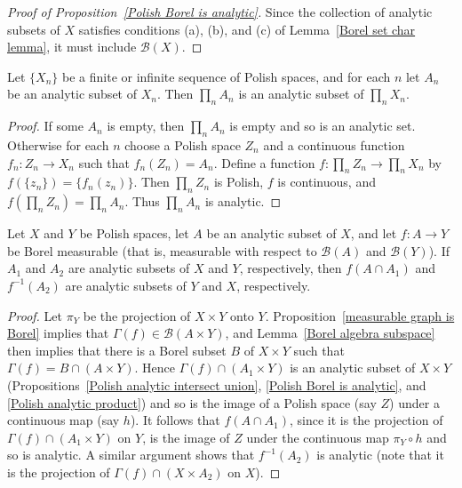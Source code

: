 \begin{proof}[Proof of Proposition~\ref{Polish Borel is analytic}]
Since the collection of analytic subsets of $X$ satisfies conditions (a), (b), and (c) of Lemma~\ref{Borel set char lemma}, it must include $\mathcal{B}(X)$.
\end{proof}
\begin{proposition}\label{Polish analytic product}
Let $\{X_n\}$ be a finite or infinite sequence of Polish spaces, and for each $n$ let $A_n$ be an analytic subset of $X_n$. Then $\prod_nA_n$ is an analytic subset of $\prod_nX_n$.
\end{proposition}
\begin{proof}
If some $A_n$ is empty, then $\prod_nA_n$ is empty and so is an analytic set. Otherwise for each $n$ choose a Polish space $Z_n$ and a continuous function $f_n:Z_n\to X_n$ such that $f_n(Z_n)=A_n$. Define a function $f:\prod_nZ_n\to\prod_nX_n$ by $f(\{z_n\})=\{f_n(z_n)\}$. Then $\prod_nZ_n$ is Polish, $f$ is continuous, and $f(\prod_nZ_n)=\prod_nA_n$. Thus $\prod_nA_n$ is analytic.
\end{proof}
\begin{proposition}\label{Polish analytic Borel image preimage is analytic}
Let $X$ and $Y$ be Polish spaces, let $A$ be an analytic subset of $X$, and let $f:A\to Y$ be Borel measurable (that is, measurable with respect to $\mathcal{B}(A)$ and $\mathcal{B}(Y)$). If $A_1$ and $A_2$ are analytic subsets of $X$ and $Y$, respectively, then $f(A\cap A_1)$ and $f^{-1}(A_2)$ are analytic subsets of $Y$ and $X$, respectively.
\end{proposition}
\begin{proof}
Let $\pi_Y$ be the projection of $X\times Y$ onto $Y$. Proposition~\ref{measurable graph is Borel} implies that $\Gamma(f)\in\mathcal{B}(A\times Y)$, and Lemma~\ref{Borel algebra subspace} then implies that there is a Borel subset $B$ of $X\times Y$ such that $\Gamma(f)=B\cap (A\times Y)$. Hence $\Gamma(f)\cap (A_1\times Y)$ is an analytic subset of $X\times Y$ (Propositions~\ref{Polish analytic intersect union}, \ref{Polish Borel is analytic}, and \ref{Polish analytic product}) and so is the image of a Polish space (say $Z$) under a continuous map (say $h$). It follows that $f(A\cap A_1)$, since it is the projection of $\Gamma(f)\cap (A_1\times Y)$ on $Y$, is the image of $Z$ under the continuous map $\pi_Y\circ h$ and so is analytic. A similar argument shows that $f^{-1}(A_2)$ is analytic (note that it is the projection of $\Gamma(f)\cap (X\times A_2)$ on $X$).
\end{proof}
